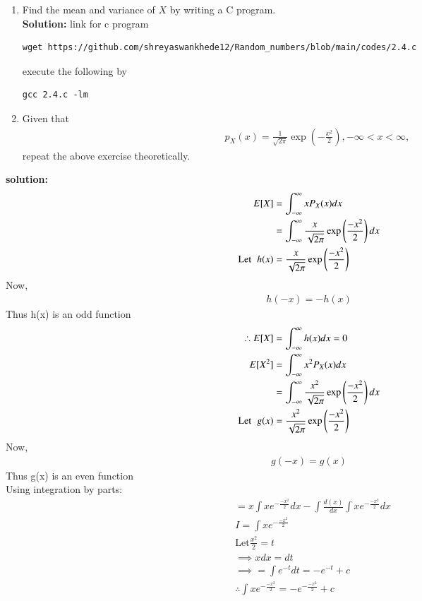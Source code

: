 \documentclass[journal,12pt,twocolumn]{IEEEtran}
\renewcommand\thesection{\arabic{section}}
\providecommand{\brak}[1]{\ensuremath{\left(#1\right)}}
\theoremstyle{remark}
\newcommand{\solution}{\noindent \textbf{Solution: }}
\numberwithin{equation}{section}
\begin{document}
\begin{enumerate}[label=\thesection.\arabic*
,ref=\thesection.\theenumi]
\begin{lstlisting}
\end{lstlisting}
\begin{figure}
\centering
\texttt{[image: 2.3.pdf]}
Fig:2.3  The PDF of X
\end{figure}
\item Find the mean and variance of $X$ by writing a C program.\\
\solution link for c program
\begin{lstlisting}
wget https://github.com/shreyaswankhede12/Random_numbers/blob/main/codes/2.4.c
\end{lstlisting}
execute the following by
\begin{lstlisting}
gcc 2.4.c -lm
\end{lstlisting}
\item Given that 
\begin{align}
p_{X}(x) = \frac{1}{\sqrt{2\pi}}\exp\brak{-\frac{x^2}{2}}, -\infty < x < \infty,
\end{align}
repeat the above exercise theoretically.
\end{enumerate}
\textbf{solution:}
\begin{align}
E[X]&=\int_{-\infty}^{\infty}xP_{X}(x)dx\\
&=\int_{-\infty}^{\infty}\dfrac{x}{\sqrt{2\pi}}\exp\brak{\dfrac{-x^2}{2}}dx\\
\text{Let}\hspace{2mm} h(x)&=\dfrac{x}{\sqrt{2\pi}}\exp\brak{\dfrac{-x^2}{2}}\nonumber
\end{align}
Now,
\begin{align}
h(-x)=-h(x)\nonumber
\end{align}
Thus h(x) is an odd function
\begin{align}
\therefore E[X]&=\int_{-\infty}^{\infty}h(x)dx=0\\
E[X^2]&=\int_{-\infty}^{\infty}x^2P_{X}(x)dx\\
&=\int_{-\infty}^{\infty}\dfrac{x^2}{\sqrt{2\pi}}\exp\brak{\dfrac{-x^2}{2}}dx\\
\text{Let}\hspace{2mm} g(x)&=\dfrac{x^2}{\sqrt{2\pi}}\exp\brak{\dfrac{-x^2}{2}}\nonumber
\end{align}
Now,
\begin{align}
g(-x)=g(x)\nonumber
\end{align}
Thus g(x) is an even function\\
Using integration by parts:
  \begin{align}
   \label{eq:eq1}
 & =x\int xe^{-\frac{-x^2}{2}} dx-\int\frac{d(x)}{dx} \int xe^{-\frac{-x^2}{2}}dx\\
 &I=\int x e^{-\frac{-x^2}{2}}\\
 &\text{Let} \frac{x^2}{2}=t \\
 &\implies x dx=dt\\
 &\implies =\int e^{-t} dt=-e^{-t} +c\\
 \label{eq:eq2}
 &\therefore \int x e^{-\frac{-x^2}{2}}=-e^{-\frac{-x^2}{2}} +c
 \end{align}
\end{document}
